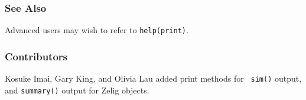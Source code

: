 \subsubsection{See Also}

Advanced users may wish to refer to {\tt help(print)}.

\subsubsection{Contributors}

Kosuke Imai, Gary King, and Olivia Lau added print methods for {\tt
  sim()} output, and {\tt summary()} output for Zelig objects.   

